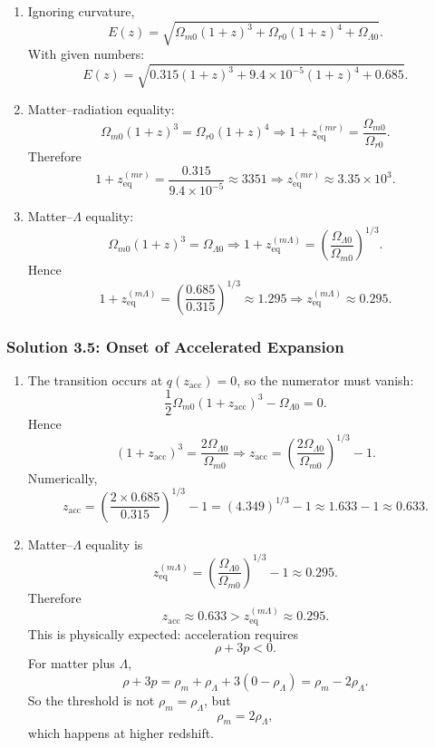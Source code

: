 \begin{enumerate}[label=(\alph*)]
  \item Ignoring curvature,
  \[
    E(z)=\sqrt{\Omega_{m0}(1+z)^3+\Omega_{r0}(1+z)^4+\Omega_{\Lambda0}}.
  \]
  With given numbers:
  \[
    E(z)=\sqrt{0.315(1+z)^3+9.4\times10^{-5}(1+z)^4+0.685}.
  \]

  \item Matter--radiation equality:
  \[
    \Omega_{m0}(1+z)^3=\Omega_{r0}(1+z)^4
    \Rightarrow
    1+z_{\mathrm{eq}}^{(mr)}=\frac{\Omega_{m0}}{\Omega_{r0}}.
  \]
  Therefore
  \[
    1+z_{\mathrm{eq}}^{(mr)}=\frac{0.315}{9.4\times10^{-5}}\approx 3351
    \Rightarrow
    z_{\mathrm{eq}}^{(mr)}\approx 3.35\times10^3.
  \]

  \item Matter--$\Lambda$ equality:
  \[
    \Omega_{m0}(1+z)^3=\Omega_{\Lambda0}
    \Rightarrow
    1+z_{\mathrm{eq}}^{(m\Lambda)}=\left(\frac{\Omega_{\Lambda0}}{\Omega_{m0}}\right)^{1/3}.
  \]
  Hence
  \[
    1+z_{\mathrm{eq}}^{(m\Lambda)}=\left(\frac{0.685}{0.315}\right)^{1/3}\approx 1.295
    \Rightarrow
    z_{\mathrm{eq}}^{(m\Lambda)}\approx 0.295.
  \]
\end{enumerate}

\subsubsection*{Solution 3.5: Onset of Accelerated Expansion}

\begin{enumerate}[label=(\alph*)]
  \item The transition occurs at $q(z_{\mathrm{acc}})=0$, so the numerator must vanish:
  \[
    \frac12\Omega_{m0}(1+z_{\mathrm{acc}})^3-\Omega_{\Lambda0}=0.
  \]
  Hence
  \[
    (1+z_{\mathrm{acc}})^3 = \frac{2\Omega_{\Lambda0}}{\Omega_{m0}}
    \Rightarrow
    z_{\mathrm{acc}} = \left(\frac{2\Omega_{\Lambda0}}{\Omega_{m0}}\right)^{1/3}-1.
  \]
  Numerically,
  \[
    z_{\mathrm{acc}}=\left(\frac{2\times0.685}{0.315}\right)^{1/3}-1
    = (4.349)^{1/3}-1
    \approx 1.633-1
    \approx 0.633.
  \]

  \item Matter--$\Lambda$ equality is
  \[
    z_{\mathrm{eq}}^{(m\Lambda)}=\left(\frac{\Omega_{\Lambda0}}{\Omega_{m0}}\right)^{1/3}-1
    \approx 0.295.
  \]
  Therefore
  \[
    z_{\mathrm{acc}}\approx 0.633 > z_{\mathrm{eq}}^{(m\Lambda)}\approx 0.295.
  \]
  This is physically expected: acceleration requires
  \[
    \rho+3p<0.
  \]
  For matter plus $\Lambda$,
  \[
    \rho+3p = \rho_m + \rho_\Lambda + 3(0-\rho_\Lambda)=\rho_m-2\rho_\Lambda.
  \]
  So the threshold is not $\rho_m=\rho_\Lambda$, but
  \[
    \rho_m=2\rho_\Lambda,
  \]
  which happens at higher redshift.
\end{enumerate}

